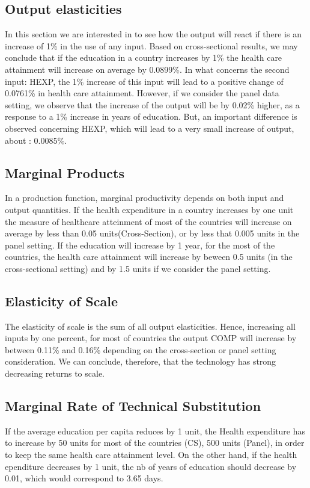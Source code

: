 \documentclass[12pt,a4paper]{article}\usepackage[]{graphicx}\usepackage[]{color}
\begin{document}
\subsection{Output elasticities}
In this section we are interested in to see how the output will react if there is an increase of 1\% in the use of any input. Based on cross-sectional results, we may conclude that if the education in a country increases by 1\% the health care attainment will increase on average by 0.0899\%. In what concerns the second input: HEXP, the 1\% increase of this input will lead to a positive change of 0.0761\% in health care attainment. However, if we consider the panel data setting, we observe that the increase of the output will be by 0.02\% higher, as a response to a 1\% increase in years of education. But, an important difference is observed concerning HEXP, which will lead to a very small increase of output, about : 0.0085\%.

\subsection{Marginal Products}
In a production function, marginal productivity depends on both input and output quantities. If the health expenditure in a country increases  by one unit the measure of healthcare atteinment of most of the countries will increase on average by less than 0.05 units(Cross-Section), or by less that  0.005 units in the panel setting. If the education will increase by 1 year, for the most of the countries, the health care attainment will increase by beween 0.5 units (in the cross-sectional setting) and by 1.5 units if we consider the panel setting.


\subsection{Elasticity of Scale}


The elasticity of scale is the sum of all output elasticities. Hence, increasing all  inputs by one percent, for most of countries
the output COMP will increase by between 0.11\% and 0.16\% depending on the cross-section or panel setting consideration.
We can conclude, therefore, that the technology has strong decreasing returns to scale.

\subsection{Marginal Rate of Technical Substitution}
If the average education per capita reduces by 1 unit, the Health expenditure has to increase by 50 units for most of the countries (CS), 500 units (Panel), in order to keep the same health care attainment level.
On the other hand, if the health ependiture decreases by 1 unit, the nb of years of education should decrease by 0.01, which would correspond to 3.65 days.
\end{document}
